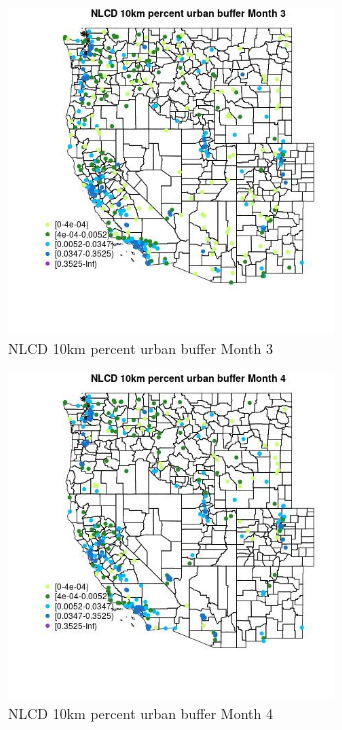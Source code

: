 \begin{figure} 
\centering  
\includegraphics[width=0.77\textwidth]{Code_Outputs/Report_ML_input_PM25_Step4_part_e_de_duplicated_aves_compiled_2019-05-18wNAs_MapObsMo3NLCD_10km_percent_urban_buffer.jpg} 
\caption{\label{fig:Report_ML_input_PM25_Step4_part_e_de_duplicated_aves_compiled_2019-05-18wNAsMapObsMo3NLCD_10km_percent_urban_buffer}NLCD 10km percent urban buffer Month 3} 
\end{figure} 
 

\begin{figure} 
\centering  
\includegraphics[width=0.77\textwidth]{Code_Outputs/Report_ML_input_PM25_Step4_part_e_de_duplicated_aves_compiled_2019-05-18wNAs_MapObsMo4NLCD_10km_percent_urban_buffer.jpg} 
\caption{\label{fig:Report_ML_input_PM25_Step4_part_e_de_duplicated_aves_compiled_2019-05-18wNAsMapObsMo4NLCD_10km_percent_urban_buffer}NLCD 10km percent urban buffer Month 4} 
\end{figure} 
 

